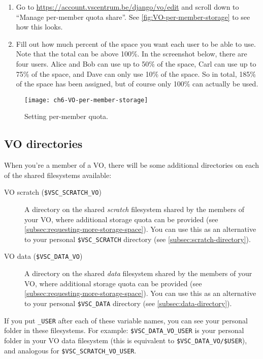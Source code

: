 \begin{enumerate}
    \item Go to \url{https://account.vscentrum.be/django/vo/edit} and scroll down
        to ``Manage per-member quota share''. See \autoref{fig:VO-per-member-storage} to see how this looks.
    \item Fill out how much percent of the space you want each user to be able to use.
        Note that the total can be above 100\%. In the screenshot below, there are
        four users. Alice and Bob can use up to 50\% of the space, Carl
        can use up to 75\% of the space, and Dave can only use 10\% of the space.
        So in total, 185\% of the space has been assigned, but of course only
        100\% can actually be used.
\end{enumerate}

\begin{figure}[!htbp]
  \caption{Setting per-member quota.}
  \centering
    \texttt{[image: ch6-VO-per-member-storage]}
\end{figure}\label{fig:VO-per-member-storage}

\subsection{VO directories}
\label{subsec:vo-directories}

When you're a member of a VO, there will be some additional directories
on each of the shared filesystems available:

\begin{description}
    \item[VO scratch (\texttt{\$VSC\_SCRATCH\_VO})]
        A directory on the shared \emph{scratch} filesystem shared by the members of your
        VO, where additional storage quota can be provided (see \autoref{subsec:requesting-more-storage-space}).
        You can use this as an alternative to your personal \lstinline|$VSC_SCRATCH|
        directory (see \autoref{subsec:scratch-directory}).

    \item[VO data (\texttt{\$VSC\_DATA\_VO})]
        A directory on the shared \emph{data} filesystem shared by the members of your
        VO, where additional storage quota can be provided (see \autoref{subsec:requesting-more-storage-space}).
        You can use this as an alternative to your personal \lstinline|$VSC_DATA|
        directory (see \autoref{subsec:data-directory}).

\end{description}

If you put \lstinline|_USER| after each of these variable names, you can see your
personal folder in these filesystems. For example: \lstinline|$VSC_DATA_VO_USER|
is your personal folder in your VO data filesystem (this is equivalent to
\lstinline|$VSC_DATA_VO/$USER|), and analogous for \lstinline|$VSC_SCRATCH_VO_USER|.

\fi
